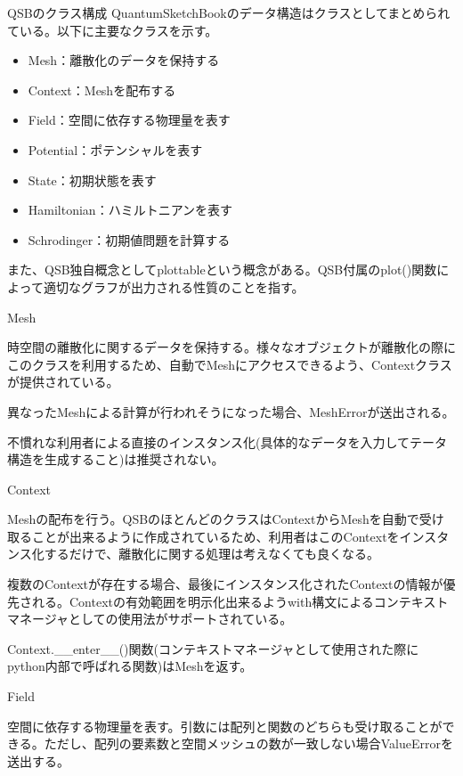 \documentclass[a4paper, lualatex]{bxjsarticle}
\begin{document}
\begin{section}{QSBのクラス構成}
    QuantumSketchBookのデータ構造はクラスとしてまとめられている。以下に主要なクラスを示す。
    \begin{itemize}
        \item Mesh：離散化のデータを保持する
        \item Context：Meshを配布する
        \item Field：空間に依存する物理量を表す
        \item Potential：ポテンシャルを表す
        \item State：初期状態を表す
        \item Hamiltonian：ハミルトニアンを表す
        \item Schrodinger：初期値問題を計算する
    \end{itemize}
    \par また、QSB独自概念としてplottableという概念がある。QSB付属のplot()関数によって適切なグラフが出力される性質のことを指す。
    \begin{subsection}{Mesh}
        \par 時空間の離散化に関するデータを保持する。様々なオブジェクトが離散化の際にこのクラスを利用するため、自動でMeshにアクセスできるよう、Contextクラスが提供されている。
        \par 異なったMeshによる計算が行われそうになった場合、MeshErrorが送出される。
        \par 不慣れな利用者による直接のインスタンス化(具体的なデータを入力してテータ構造を生成すること)は推奨されない。
    \end{subsection}
    \begin{subsection}{Context}
        \par Meshの配布を行う。QSBのほとんどのクラスはContextからMeshを自動で受け取ることが出来るように作成されているため、利用者はこのContextをインスタンス化するだけで、離散化に関する処理は考えなくても良くなる。
        \par 複数のContextが存在する場合、最後にインスタンス化されたContextの情報が優先される。Contextの有効範囲を明示化出来るようwith構文によるコンテキストマネージャとしての使用法がサポートされている。
        \par Context.__enter__()関数(コンテキストマネージャとして使用された際にpython内部で呼ばれる関数)はMeshを返す。
    \end{subsection}
    \begin{subsection}{Field}
        \par 空間に依存する物理量を表す。引数には配列と関数のどちらも受け取ることができる。ただし、配列の要素数と空間メッシュの数が一致しない場合ValueErrorを送出する。

\end{subsection}
\end{section}
\end{document}
